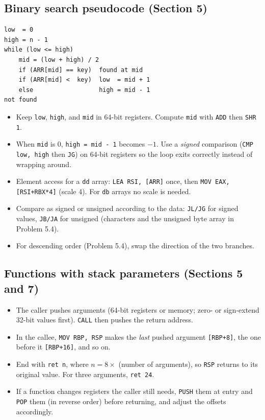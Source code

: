 \documentclass[11pt,letterpaper]{article}
\begin{document}
\subsection*{Binary search pseudocode (Section 5)}
\begin{lstlisting}[style=out]
low  = 0
high = n - 1
while (low <= high)
    mid = (low + high) / 2
    if (ARR[mid] == key)  found at mid
    if (ARR[mid] <  key)  low  = mid + 1
    else                  high = mid - 1
not found
\end{lstlisting}
\begin{itemize}[itemsep=2pt]
  \item Keep \texttt{low}, \texttt{high}, and \texttt{mid} in 64-bit registers. Compute \texttt{mid} with \texttt{ADD} then \texttt{SHR 1}.
  \item When \texttt{mid} is 0, \texttt{high = mid - 1} becomes $-1$. Use a \emph{signed} comparison (\texttt{CMP low, high} then \texttt{JG}) on 64-bit registers so the loop exits correctly instead of wrapping around.
  \item Element access for a \texttt{dd} array: \texttt{LEA RSI, [ARR]} once, then \texttt{MOV EAX, [RSI+RBX*4]} (scale 4). For \texttt{db} arrays no scale is needed.
  \item Compare as signed or unsigned according to the data: \texttt{JL/JG} for signed values, \texttt{JB/JA} for unsigned (characters and the unsigned byte array in Problem 5.4).
  \item For descending order (Problem 5.4), swap the direction of the two branches.
\end{itemize}

\subsection*{Functions with stack parameters (Sections 5 and 7)}
\begin{itemize}[itemsep=2pt]
  \item The caller pushes arguments (64-bit registers or memory; zero- or sign-extend 32-bit values first). \texttt{CALL} then pushes the return address.
  \item In the callee, \texttt{MOV RBP, RSP} makes the \emph{last} pushed argument \texttt{[RBP+8]}, the one before it \texttt{[RBP+16]}, and so on.
  \item End with \texttt{ret n}, where $n = 8 \times$ (number of arguments), so \texttt{RSP} returns to its original value. For three arguments, \texttt{ret 24}.
  \item If a function changes registers the caller still needs, \texttt{PUSH} them at entry and \texttt{POP} them (in reverse order) before returning, and adjust the offsets accordingly.
\end{itemize}
\end{document}
